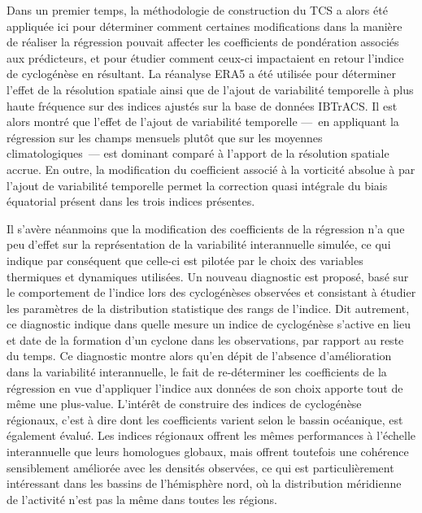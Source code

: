\documentclass[../main.tex]{subfiles}
\begin{document}
Dans un premier temps, la méthodologie de construction du TCS a alors été appliquée ici pour déterminer comment certaines modifications dans la manière de
réaliser la régression pouvait affecter les coefficients de pondération associés aux prédicteurs, et pour étudier comment ceux-ci impactaient en retour l'indice
de cyclogénèse en résultant. La réanalyse ERA5 a été utilisée pour déterminer l'effet de la résolution spatiale ainsi que de l'ajout de variabilité temporelle à
plus haute fréquence sur des indices ajustés sur la base de données IBTrACS. Il est alors montré que l'effet de l'ajout de variabilité temporelle ---~en
appliquant la régression sur les champs mensuels plutôt que sur les moyennes climatologiques~--- est dominant comparé à l'apport de la résolution spatiale
accrue. En outre, la modification du coefficient associé à la vorticité absolue à  par l'ajout de variabilité temporelle permet la correction quasi
intégrale du biais équatorial présent dans les trois indices présentes.

Il s'avère néanmoins que la modification des coefficients de la régression n'a que peu d'effet sur la représentation de la variabilité interannuelle simulée, ce
qui indique par conséquent que celle-ci est pilotée par le choix des variables thermiques et dynamiques utilisées. Un nouveau diagnostic est proposé, basé
sur le comportement de l'indice lors des cyclogénèses observées et consistant à étudier les paramètres de la distribution statistique des rangs de l'indice. Dit
autrement, ce diagnostic indique dans quelle mesure un indice de cyclogénèse s'active en lieu et date de la formation d'un cyclone dans les observations, par
rapport au reste du temps. Ce diagnostic montre alors qu'en dépit de l'absence d'amélioration dans la variabilité interannuelle, le fait de re-déterminer les
coefficients de la régression en vue d'appliquer l'indice aux données de son choix apporte tout de même une plus-value. L'intérêt de construire des indices de
cyclogénèse régionaux, c'est à dire dont les coefficients varient selon le bassin océanique, est également évalué. Les indices régionaux offrent les mêmes
performances à l'échelle interannuelle que leurs homologues globaux, mais offrent toutefois une cohérence sensiblement améliorée avec les densités observées, ce
qui est particulièrement intéressant dans les bassins de l'hémisphère nord, où la distribution méridienne de l'activité n'est pas la même dans toutes les
régions.
\end{document}
